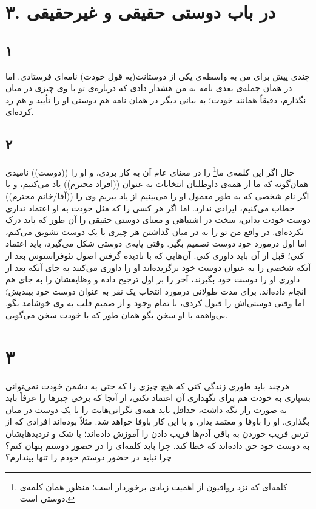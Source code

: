 \documentclass{article}
\author{github.com/parasilius/moral-letters-to-lucilius}
\begin{document}
\section*{۳. در باب دوستی حقیقی و غیرحقیقی}
    \subsection*{۱}
    چندی پیش برای من به واسطه‌ی یکی از دوستانت(به قول خودت) نامه‌ای فرستادی.
    اما در همان جمله‌ی بعدی نامه به من هشدار دادی که درباره‌ی تو با وی چیزی در میان نگذارم، دقیقاً همانند خودت؛
    به بیانی دیگر در همان نامه هم دوستی او را تأیید و هم رد کرده‌ای.
    \subsection*{۲}
    حال اگر این کلمه‌ی ما\footnote{کلمه‌ای که نزد رواقیون از اهمیت زیادی برخوردار است؛ منظور همان کلمه‌ی دوستی است.} را در معنای عام آن به کار بردی، و او را ((دوست)) نامیدی همان‌گونه که ما از همه‌ی داوطلبان انتخابات به عنوان ((افراد محترم)) یاد می‌کنیم، و یا اگر نام شخصی که به طور معمول او را می‌بینیم از یاد ببریم وی را ((آقا/خانم محترم)) حطاب می‌‌کنیم، ایرادی ندارد.
    اما اگر هر کسی را که مثل خودت به او اعتماد نداری دوست خودت بدانی، سخت در اشتباهی و معنای دوستی حقیقی را آن طور که باید درک نکرده‌ای.
    در واقع من تو را به در میان گذاشتن هر چیزی با یک دوست تشویق می‌کنم، اما اول درمورد خود دوست تصمیم بگیر.
    وقتی پایه‌ی دوستی شکل می‌گیرد، باید اعتماد کنی؛ قبل از آن باید داوری کنی.
    آن‌هایی که با نادیده گرفتن اصول تئوفراستوس بعد از آنکه شخصی را به عنوان دوست خود برگزیده‌اند او را داوری می‌کنند به جای آنکه بعد از داوری او را دوست خود بگیرند، آخر را بر اول ترجیح داده و وظایفشان را به جای هم انجام داده‌اند.
    برای مدت طولانی درمورد انتخاب یک نفر به عنوان دوست خود بیندیش؛ اما وقتی دوستی‌اش را قبول کردی، با تمام وجود و از صمیم قلب به وی خوشامد بگو.
    بی‌واهمه با او سخن بگو همان طور که با خودت سخن می‌گویی.
    \section*{۳}
    هرچند باید طوری زندگی کنی که هیچ چیزی را که حتی به دشمن خودت نمی‌توانی بسپاری به خودت هم برای نگهداری آن اعتماد نکنی، از آنجا که برخی چیزها را عرفاً باید به صورت راز نگه داشت، حداقل باید همه‌ی نگرانی‌هایت را با یک دوست در میان بگذاری.
    او را باوفا و معتمد بدار، و با این کار باوفا خواهد شد.
    مثلاً بوده‌اند افرادی که از ترس فریب خوردن به باقی آدم‌ها فریب دادن را آموزش داده‌اند؛
    با شک و تردیدهایشان به دوست خود حق داده‌اند که خطا کند.
    چرا باید کلمه‌ای را در حضور دوستم پنهان کنم؟
    چرا نباید در حضور دوستم خودم را تنها بپندارم؟
\end{document}
